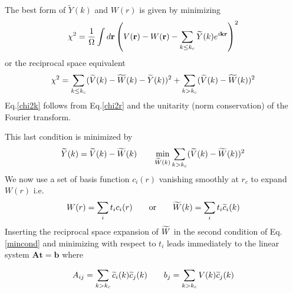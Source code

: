 The best form of $\widetilde{Y}(k)$ and $W(r)$ is given by minimizing
\begin{equation}
  \chi^2=\frac{1}{\Omega}\int d\mathbf{r} \left(V(\mathbf{r})-W(\mathbf{r})-
  \sum_{k\le k_c}\widetilde{Y}(k)e^{i\mathbf{k}\mathbf{r}}\right)^2
  \label{chi2r}
\end{equation}
or the reciprocal space equivalent
\begin{equation}
  \chi^2=\sum_{k\le k_c}(\widetilde{V}(k)-\widetilde{W}(k)-\widetilde{Y}(k))^2+\sum_{k>k_c}(\widetilde{V}(k)-\widetilde{W}(k))^2
  \label{chi2k}
\end{equation}
Eq.\ref{chi2k} follows from Eq.\ref{chi2r} and the unitarity
(norm conservation) of the Fourier transform.

This last condition is minimized by
\begin{equation}
\widetilde{Y}(k)=\widetilde{V}(k)-\widetilde{W}(k)\qquad \min_{\widetilde{W}(k)}\sum_{k>k_c}(\widetilde{V}(k)-\widetilde{W}(k))^2
\label{mincond}
\end{equation}
We now use a set of basis function $c_i(r)$ vanishing smoothly at $r_c$
to expand $W(r)$ i.e.
\begin{equation}
W(r)=\sum_i t_i c_i(r)\qquad\text{or}\qquad \widetilde{W}(k)=\sum_i t_i \widetilde{c}_i(k)
\end{equation}
Inserting the reciprocal space expansion of $\widetilde{W}$ in the second condition of
Eq.\ref{mincond} and minimizing with respect to $t_i$ leads immediately
to the linear system $\mathbf{A}\mathbf{t}=\mathbf{b}$ where
\begin{center}
\vskip 3mm
\begin{eqnarray}
A_{ij}=\sum_{k>k_c}\widetilde{c}_i(k)\widetilde{c}_j(k)\qquad b_j=\sum_{k>k_c} V(k) \widetilde{c}_j(k)
\label{matrix_elements}
\end{eqnarray}

\end{center}
\vskip 3mm

